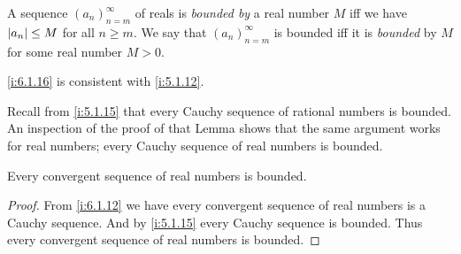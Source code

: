 \begin{defn}\label{i:6.1.16}
  A sequence \((a_n)_{n = m}^\infty\) of reals is \emph{bounded by} a real number \(M\) iff we have \(\left\lvert a_n\right\rvert \leq M\) for all \(n \geq m\).
  We say that \((a_n)_{n = m}^\infty\) is bounded iff it is \emph{bounded} by \(M\) for some real number \(M > 0\).
\end{defn}

\begin{note}
  \cref{i:6.1.16} is consistent with \cref{i:5.1.12}.
\end{note}

\begin{note}
  Recall from \cref{i:5.1.15} that every Cauchy sequence of rational numbers is bounded.
  An inspection of the proof of that Lemma shows that the same argument works for real numbers;
  every Cauchy sequence of real numbers is bounded.
\end{note}

\begin{cor}\label{i:6.1.17}
  Every convergent sequence of real numbers is bounded.
\end{cor}

\begin{proof}
  From \cref{i:6.1.12} we have every convergent sequence of real numbers is a Cauchy sequence.
  And by \cref{i:5.1.15} every Cauchy sequence is bounded.
  Thus every convergent sequence of real numbers is bounded.
\end{proof}

